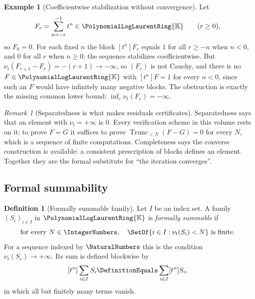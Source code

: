 \documentclass[11pt,oneside]{article}
\theoremstyle{plain}
\theoremstyle{definition}
\newtheorem{definition}[theorem]{Definition}
\newtheorem{example}[theorem]{Example}
\theoremstyle{remark}
\newtheorem{remark}[theorem]{Remark}
\newcommand{\K}{\mathbb{K}}
\newcommand{\PLlau}{\PolynomialLogLaurentRing{\K}}       %
\newcommand{\ordt}{\nu_{t}}                              %
\newcommand{\Trunc}[2]{\operatorname{Trunc}_{<#2}#1}     %
\begin{document}
\begin{example}[Coefficientwise stabilization without convergence]
\label{plt:ex:trunc-not-cauchy}
Let
\[
  F_r=\sum_{n=-r}^{-1}t^n\in\PLlau
  \qquad(r\ge0),
\]
so \(F_0=0\).  For each fixed \(n\) the block \([t^n]F_r\) equals \(1\) for
all \(r\ge-n\) when \(n<0\), and \(0\) for all \(r\) when \(n\ge0\): the
sequence stabilizes coefficientwise.  But
\(\ordt(F_{r+1}-F_r)=-(r+1)\to-\infty\), so \((F_r)\) is not Cauchy, and there
is no \(F\in\PLlau\) with \([t^n]F=1\) for every \(n<0\), since such an \(F\)
would have infinitely many negative blocks.  The obstruction is exactly the
missing common lower bound: \(\inf_r\ordt(F_r)=-\infty\).
\end{example}

\begin{remark}[Separatedness is what makes residuals certificates]
\label{plt:rmk:trunc-separated}
Separatedness says that an element with \(\ordt=+\infty\) is \(0\).  Every
verification scheme in this volume rests on it: to prove \(F=G\) it suffices
to prove \(\Trunc{(F-G)}{N}=0\) for every \(N\), which is a sequence of finite
computations.  Completeness says the converse construction is available: a
consistent prescription of blocks defines an element.  Together they are the
formal substitute for ``the iteration converges''.
\end{remark}

\subsection{Formal summability}
\label{plt:sec:trunc-summability}

\begin{definition}[Formally summable family]
\label{plt:def:trunc-summable}
Let \(I\) be an index set.  A family \((S_i)_{i\in I}\) in \(\PLlau\) is
\emph{formally summable} if
\begin{equation}\label{plt:eq:trunc-summable}
  \text{for every }N\in\IntegerNumbers,\quad
  \SetOf{i\in I:\ordt(S_i)<N}\ \text{is finite.}
\end{equation}
For a sequence indexed by \(\NaturalNumbers\) this is the condition
\(\ordt(S_r)\to+\infty\).  Its sum is defined blockwise by
\begin{equation}\label{plt:eq:trunc-sum}
  [t^n]\sum_{i\in I}S_i\DefinitionEquals\sum_{i\in I}[t^n]S_i ,
\end{equation}
in which all but finitely many terms vanish.
\end{definition}
\end{document}
